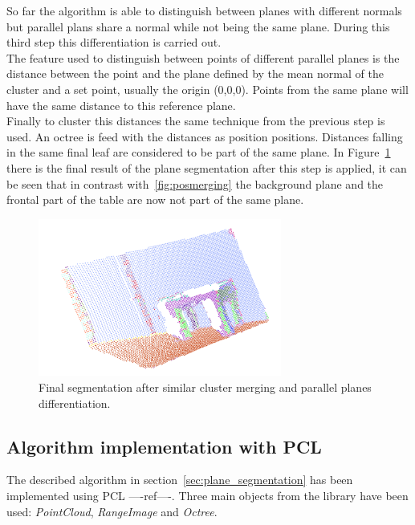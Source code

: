 \documentclass[fontsize=12pt]{article}
\begin{document}
So far the algorithm is  able to distinguish between planes with different normals but parallel plans share a normal while not being the same plane. During this third step this differentiation is carried out.\\


The feature used to distinguish between points of different parallel planes is the distance between the point and the plane defined by the mean normal of the cluster and a set point, usually the origin (0,0,0). Points from the same plane will have the same distance to this reference plane.\\

Finally to cluster this distances the same technique from the previous step is used. An octree is feed with the distances as position positions. Distances falling in the same final leaf are considered to be part of the same plane. In Figure~\ref{fig:final_segmentation} there is the final result of the plane segmentation after this step is applied, it can be seen that in contrast with~\ref{fig:posmerging} the background plane and the frontal part of the table are now not part of the same plane.\\

\begin{figure}[!htbp]
  \begin{center}
    \includegraphics[width=8cm]{./images/finalSegmentation.png}
    \caption{Final segmentation after similar cluster merging and parallel planes differentiation.}
    \label{fig:final_segmentation}
  \end{center}
\end{figure}


\subsection{Algorithm implementation with PCL}
\label{sub:algorithm_implementation_with_pcl}

The described algorithm in section~\ref{sec:plane_segmentation} has been implemented using PCL ----ref----. Three main objects from the library have been used: \textit{PointCloud}, \textit{RangeImage} and \textit{Octree}.\\
\end{document}
